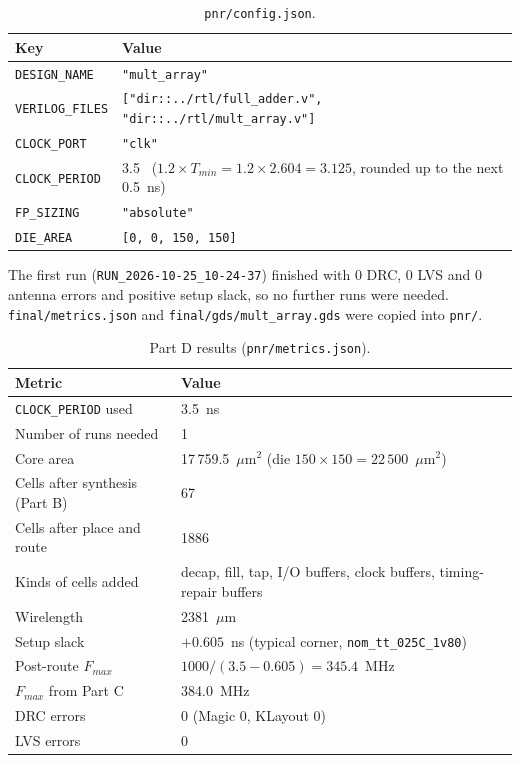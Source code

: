\documentclass[11pt,a4paper]{article}
\newcommand{\umsq}{\ensuremath{\mu\mathrm{m}^2}}
\newcommand{\um}{\ensuremath{\mu\mathrm{m}}}
\begin{document}
\begin{table}[H]
\centering
\begin{tabular}{ll}
\toprule
Key & Value \\
\midrule
\texttt{DESIGN\_NAME} & \texttt{"mult\_array"} \\
\texttt{VERILOG\_FILES} & \texttt{["dir::../rtl/full\_adder.v", "dir::../rtl/mult\_array.v"]} \\
\texttt{CLOCK\_PORT} & \texttt{"clk"} \\
\texttt{CLOCK\_PERIOD} & 3.5 \ ($1.2 \times T_{min} = 1.2 \times 2.604 = 3.125$, rounded up to the next 0.5~ns) \\
\texttt{FP\_SIZING} & \texttt{"absolute"} \\
\texttt{DIE\_AREA} & \texttt{[0, 0, 150, 150]} \\
\bottomrule
\end{tabular}
\caption{\texttt{pnr/config.json}.}
\end{table}

The first run (\texttt{RUN\_2026-10-25\_10-24-37}) finished with 0 DRC, 0 LVS and
0 antenna errors and positive setup slack, so no further runs were needed.
\texttt{final/metrics.json} and \texttt{final/gds/mult\_array.gds} were copied
into \texttt{pnr/}.

\begin{table}[H]
\centering
\begin{tabular}{ll}
\toprule
Metric & Value \\
\midrule
\texttt{CLOCK\_PERIOD} used & 3.5~ns \\
Number of runs needed & 1 \\
Core area & 17\,759.5~\umsq{} (die $150 \times 150 = 22\,500$~\umsq) \\
Cells after synthesis (Part B) & 67 \\
Cells after place and route & 1886 \\
Kinds of cells added & decap, fill, tap, I/O buffers, clock buffers, timing-repair buffers \\
Wirelength & 2381~\um{} \\
Setup slack & $+0.605$~ns (typical corner, \texttt{nom\_tt\_025C\_1v80}) \\
Post-route $F_{max}$ & $1000 / (3.5 - 0.605) = 345.4$~MHz \\
$F_{max}$ from Part C & 384.0~MHz \\
DRC errors & 0 (Magic 0, KLayout 0) \\
LVS errors & 0 \\
\bottomrule
\end{tabular}
\caption{Part D results (\texttt{pnr/metrics.json}).}
\end{table}
\end{document}
